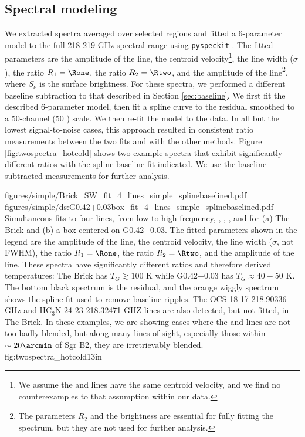 \subsection{Spectral modeling}
\label{sec:spectralmodeling}
We extracted spectra averaged over selected regions and fitted
a 6-parameter model to the full 218-219 GHz spectral range using
\texttt{pyspeckit} \citep{Ginsburg2011c}.  The fitted parameters are the
amplitude of the \formaldehyde \threeohthree line, the centroid
velocity\footnote{We assume the \methanol and \formaldehyde lines have the same
centroid velocity, and we find no counterexamples to that assumption within our
data.}, the line width ($\sigma$), the ratio $R_1 = \Rone$, the ratio $R_2 =
\Rtwo$, and the
amplitude of the \methanol \fourtwotwo line\footnote{The parameters $R_2$ and
the \methanol brightness are essential for fully fitting the spectrum, but they
are not used for further analysis.}, where $S_\nu$ is the surface
brightness.  For these spectra, we performed a different baseline subtraction
to that described in Section
\ref{sec:baseline}.  We first fit the described 6-parameter model, then fit a
spline curve to the residual smoothed to a 50-channel (50 \kms) scale.  We then
re-fit the model to the data.  In all but the lowest signal-to-noise cases,
this approach resulted in consistent ratio measurements between the two fits
and with the other methods.  Figure \ref{fig:twospectra_hotcold} shows two
example spectra that exhibit significantly different ratios with the spline
baseline fit indicated.  We use the baseline-subtracted measurements for
further analysis.

\FigureTwo
{figures/simple/Brick_SW_fit_4_lines_simple_splinebaselined.pdf}
{figures/simple/ds:G0.42+0.03box_fit_4_lines_simple_splinebaselined.pdf}
{
Simultaneous fits to four lines, from low to high frequency, \para
\threeohthree, \methanol \fourtwotwo, \para \threetwotwo, and \para \threetwoone
for (a) The Brick and (b) a box centered on G0.42+0.03.  The fitted parameters
shown in the legend are the amplitude of the \formaldehyde \threeohthree line,
the centroid velocity, the line width ($\sigma$, not FWHM), the ratio $R_1 =
\Rone$, the ratio $R_2 = \Rtwo$, and the amplitude of the \methanol \fourtwotwo
line.  These spectra have significantly different ratios and therefore derived
temperatures: The Brick has $T_G\gtrsim100$ K while G0.42+0.03 has
$T_G\approx40-50$ K.  The bottom black spectrum is the residual, and the orange
wiggly spectrum shows the spline fit used to remove baseline ripples.
The OCS 18-17 218.90336 GHz and HC$_3$N 24-23 218.32471 GHZ lines are also
detected, but not fitted, in The Brick.
In these examples, we are showing cases where the \methanol \fourtwotwo and
\para \threetwotwo lines are not too badly blended, but along many lines of
sight, especially those within $\sim20\arcmin$ of Sgr B2, they are
irretrievably blended.
}
{fig:twospectra_hotcold}{1}{3in}


